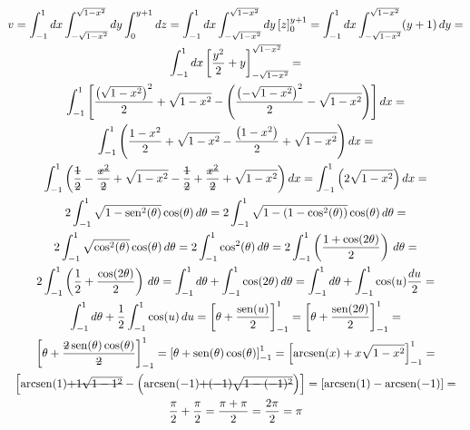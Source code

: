 \begin{enumerate}
	\begin{gather*}
		v = \int_{-1}^1 dx \int_{-\sqrt{1 - x^2}}^{\sqrt{1 - x^2}} dy \int_0^{y + 1} dz = \int_{-1}^1 dx \int_{-\sqrt{1 - x^2}}^{\sqrt{1 - x^2}} dy \left[z\right]_0^{y + 1} = \int_{-1}^1 dx \int_{-\sqrt{1 - x^2}}^{\sqrt{1 - x^2}} (y + 1)\, dy =\\ \int_{-1}^1 dx \left[\dfrac{y^2}{2} + y\right]_{-\sqrt{1 - x^2}}^{\sqrt{1 - x^2}} =\\ \int_{-1}^1 \left[\dfrac{\left(\sqrt{1 - x^2}\right)^2}{2} + \sqrt{1 - x^2} - \left(\dfrac{\left(-\sqrt{1 - x^2}\right)^2}{2} - \sqrt{1 - x^2}\right)\right] dx =\\ \int_{-1}^1 \left(\dfrac{1 - x^2}{2} + \sqrt{1 - x^2} - \dfrac{\left(1 - x^2\right)}{2} + \sqrt{1 - x^2}\right) dx =\\ \int_{-1}^1 \left(\dfrac{\overstrike{1}}{\overstrike{2}} - \dfrac{\overstrike{x^2}}{\overstrike{2}} + \sqrt{1 - x^2} - \dfrac{\overstrike{1}}{\overstrike{2}} + \dfrac{\overstrike{x^2}}{\overstrike{2}} + \sqrt{1 - x^2}\right) dx = \int_{-1}^1 \left(2\sqrt{1 - x^2}\right) dx =\\ 2\int_{-1}^1 \sqrt{1 - \sen^2(\theta)} \cos(\theta)\, d\theta = 2\int_{-1}^1 \sqrt{1 - \left(1 - \cos^2(\theta)\right)} \cos(\theta)\, d\theta =\\ 2\int_{-1}^1 \sqrt{ \cos^2(\theta)} \cos(\theta)\, d\theta = 2\int_{-1}^1 \cos^2(\theta)\, d\theta =  2\int_{-1}^1 \left(\dfrac{1 + \cos(2\theta)}{2}\right)\, d\theta =\\ 2\int_{-1}^1 \left(\dfrac{1}{2} + \dfrac{\cos(2\theta)}{2}\right)\, d\theta = \int_{-1}^1 d\theta + \int_{-1}^1 \cos(2\theta)\, d\theta = \int_{-1}^1 d\theta + \int_{-1}^1 \cos(u)\dfrac{du}{2} =\\ \int_{-1}^1 d\theta + \dfrac{1}{2}\int_{-1}^1 \cos(u)\, du = \left[\theta + \dfrac{\sen(u)}{2}\right]_{-1}^1 = \left[\theta + \dfrac{\sen(2\theta)}{2}\right]_{-1}^1 =\\ \left[\theta + \dfrac{\overstrike{2}\sen(\theta)\cos(\theta)}{\overstrike{2}}\right]_{-1}^1 = \left[\theta + \sen(\theta)\cos(\theta)\right]_{-1}^1 = \left[\arcsen(x) + x\sqrt{1 - x^2}\right]_{-1}^1 =\\ \left[\arcsen(1) \overstrike{+ 1\sqrt{1 - 1^2}} - \left(\arcsen(-1) \overstrike{+ (-1)\sqrt{1 - (-1)^2}}\right)\right] = \left[\arcsen(1) - \arcsen(-1)\right] =\\ \dfrac{\pi}{2} + \dfrac{\pi}{2} = \dfrac{\pi + \pi}{2} = \dfrac{2\pi}{2} = \pi
	\end{gather*}
	\begin{equation*}

\end{equation*}
\end{enumerate}

